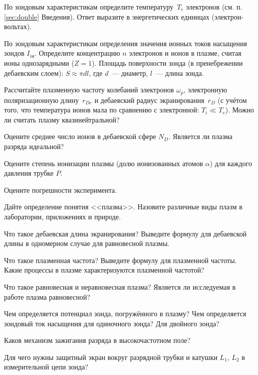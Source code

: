 \begin{lab:task}
\item По зондовым характеристикам определите температуру~$T_e$ электронов
(см. п. \ref{sec:double} Введения). Ответ
выразите в энергетических единицах (электрон-вольтах).

\item По зондовым характеристикам определения значения ионных токов насыщения
зондов $I_{iн}$. 
Определите концентрацию $n$ электронов и ионов в плазме, 
считая ионы однозарядными ($Z=1$).
Площадь поверхности зонда (в пренебрежении
дебаевским слоем): $S\approx \pi d l$, где 
$d$~--- диаметр, $l$~--- длина зонда.

\item Рассчитайте плазменную частоту колебаний электронов $\omega_p$,
электронную поляризационную длину~$r_{De}$ и дебаевский радиус экранирования~$r_D$
(с учётом того, что температура ионов мала по сравнению с электронной: $T_i\ll T_e$). 
Можно ли считать плазму квазинейтральной?

\item Оцените среднее число ионов в дебаевской сфере $N_D$. 
Является ли плазма разряда идеальной?

\item Оцените степень ионизации плазмы (долю ионизованных атомов $\alpha$)
для каждого давления трубке $P$.

\item Оцените погрешности эксперимента.

\end{lab:task}

\begin{lab:questions}
    \item Дайте определение понятия <<плазма>>. Назовите различные виды плазм в лаборатории, 
    приложениях и природе.
    
    \item Что такое дебаевская длина экранирования? Выведите формулу
    для дебаевской длины в одномерном случае для равновесной плазмы.
    
    \item Что такое плазменная частота? Выведите формулу для плазменной частоты.
    Какие процессы в плазме характеризуются плазменной частотой?

    \item Что такое равновесная и неравновесная плазма? 
    Является ли исследуемая в работе плазма равновесной?
        
    \item Чем определяется потенциал зонда, погружённого в плазму? 
    Чем определяется зондовый ток насыщения для одиночного зонда? Для двойного
    зонда?
    
    \item Каков механизм зажигания разряда в высокочастотном поле?
    
    \item Для чего нужны защитный экран вокруг разрядной трубки и катушки $L_1$, $L_2$ в измерительной
    цепи зонда?
\end{lab:questions}


